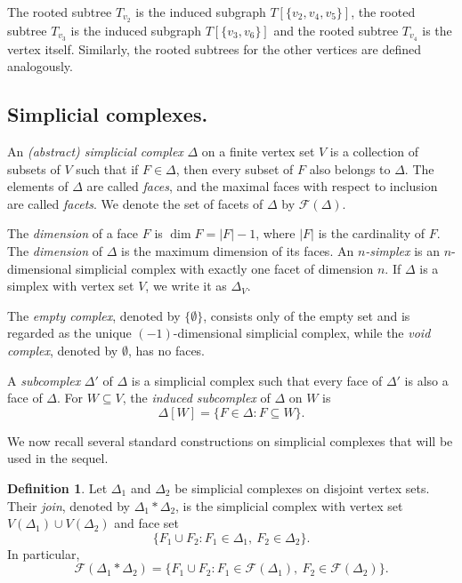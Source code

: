 \documentclass[12pt,reqno]{amsart}
\theoremstyle{definition}
\newtheorem{definition}[theorem]{Definition}
\begin{document}
The rooted subtree $T_{v_2}$ is the induced subgraph $T[\{v_2,v_4,v_5\}]$, the rooted subtree $T_{v_3}$ is the induced subgraph $T[\{v_3,v_6\}]$ and the rooted subtree $T_{v_4}$ is the vertex itself. Similarly, the rooted subtrees for the other vertices are defined analogously. 

\subsection{Simplicial complexes.}

An \emph{(abstract) simplicial complex} $\Delta$ on a finite vertex set $V$ is a collection of subsets of $V$ such that if $F \in \Delta$, then every subset of $F$ also belongs to $\Delta$. The elements of $\Delta$ are called \emph{faces}, and the maximal faces with respect to inclusion are called \emph{facets}. We denote the set of facets of $\Delta$ by $\mathcal{F}(\Delta)$. 

The \emph{dimension} of a face $F$ is $\dim F = |F|-1$, where $|F|$ is the cardinality of $F$. The \emph{dimension} of $\Delta$ is the maximum dimension of its faces. An {\it $n$-simplex} is an $n$-dimensional simplicial complex with exactly one facet of dimension $n$. If $\Delta$ is a simplex with vertex set $V$, we write it as $\Delta_V$.

The \emph{empty complex}, denoted by $\{\emptyset\}$, consists only of the empty set and is regarded as the unique $(-1)$-dimensional simplicial complex, while the \emph{void complex}, denoted by $\emptyset$, has no faces. 

A \emph{subcomplex} $\Delta'$ of $\Delta$ is a simplicial complex such that every face of $\Delta'$ is also a face of $\Delta$. For $W \subseteq V$, the \emph{induced subcomplex} of $\Delta$ on $W$ is
\[
\Delta[W]=\{F \in \Delta : F \subseteq W\}.
\]

\medskip

We now recall several standard constructions on simplicial complexes that will be used in the sequel.

\begin{definition}\label{def: join of a SC}
Let $\Delta_1$ and $\Delta_2$ be simplicial complexes on disjoint vertex sets. Their \emph{join}, denoted by $\Delta_1 * \Delta_2$, is the simplicial complex with vertex set $V(\Delta_1)\cup V(\Delta_2)$ and face set
\[
\{F_1 \cup F_2 : F_1 \in \Delta_1,\ F_2 \in \Delta_2\}.
\]
In particular,
\[
\mathcal{F}(\Delta_1 * \Delta_2)
=
\{F_1 \cup F_2 : F_1 \in \mathcal{F}(\Delta_1),\ F_2 \in \mathcal{F}(\Delta_2)\}.
\]
\end{definition}
\end{document}
